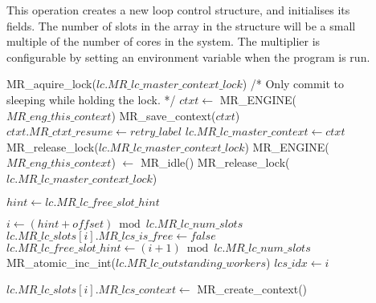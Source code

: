 \begin{description}
\item[]
This operation creates a new loop control structure,
and initialises its fields.
The number of slots in the array in the structure
will be a small multiple of the number of cores in the system.
The multiplier is configurable
by setting an environment variable when the program is run.

\begin{algorithm}[tbp]
\begin{algorithmic}

        \State MR\_aquire\_lock($lc.MR\_lc\_master\_context\_lock$)
            \State /* Only commit to sleeping while holding the lock. */
            \State $ctxt \gets$ MR\_ENGINE($MR\_eng\_this\_context$)
            \State MR\_save\_context($ctxt$)
            \State $ctxt.MR\_ctxt\_resume \gets retry\_label$
            \State $lc.MR\_lc\_master\_context \gets ctxt$
            \State MR\_release\_lock($lc.MR\_lc\_master\_context\_lock$)
            \State MR\_ENGINE($MR\_eng\_this\_context$) $\gets$ \NULL
            \State MR\_idle()
        \EndIf 
        \State MR\_release\_lock($lc.MR\_lc\_master\_context\_lock$)
    \EndIf

    \State $hint \gets lc.MR\_lc\_free\_slot\_hint$

        \State $i \gets (hint + offset) \bmod lc.MR\_lc\_num\_slots$
            \State $lc.MR\_lc\_slots[i].MR\_lcs\_is\_free \gets false$
            \State $lc.MR\_lc\_free\_slot\_hint \gets
                (i + 1) \bmod lc.MR\_lc\_num\_slots$
            \State MR\_atomic\_inc\_int($lc.MR\_lc\_outstanding\_workers$)
            \State $lcs\_idx \gets i$
            \State \Break
        \EndIf 
    \EndFor 

        \State $lc.MR\_lc\_slots[i].MR\_lcs\_context \gets$
            MR\_create\_context()
    \EndIf


\end{algorithmic}
\end{algorithm}
\end{description}
